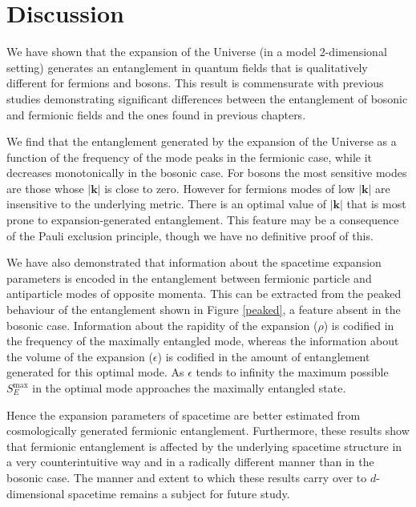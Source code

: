 \section{Discussion}\label{conclusionsexp}

We have shown that the expansion of the Universe (in a model 2-dimensional setting) generates an entanglement in quantum fields that is qualitatively different for fermions and bosons.  This result is commensurate with previous studies demonstrating significant differences between the entanglement of bosonic and fermionic fields  \cite{Alicefalls,AlsingSchul,Adeschul} and the ones found in previous chapters.  


 We find that the entanglement generated by the expansion of the Universe as a function of the frequency of the mode peaks in the fermionic case, while  it decreases monotonically in the bosonic case. 
For bosons the most sensitive modes are those  whose $|\bm k|$ is close to zero. However for fermions modes of low $|\bm k|$ are insensitive to the underlying metric. There is an optimal value of $|\bm k|$ that is most prone to expansion-generated entanglement.  This feature may be a consequence of the Pauli exclusion principle, though we have no definitive proof of this.
 
 We have also demonstrated that information about the spacetime expansion parameters  is encoded
  in the entanglement between fermionic particle and antiparticle modes of opposite momenta.  This can be extracted from
the peaked behaviour of the entanglement shown in Figure \ref{peaked}, a feature  absent in the bosonic case.  
Information about the rapidity of the expansion ($\rho$) is codified in the frequency of the maximally entangled mode, whereas the information about the volume of the expansion ($\epsilon$) is codified in the amount of entanglement generated for this optimal mode. As  $\epsilon$ tends to infinity the maximum possible $S_E^{\text{max}}$ in the optimal mode approaches the maximally entangled state. 


Hence the expansion parameters of spacetime are better estimated from cosmologically generated fermionic entanglement.   Furthermore, these results   show that fermionic entanglement is affected by the underlying spacetime structure in a very counterintuitive way and in a radically different manner than in the bosonic case.  The manner and extent to which these results carry over to $d$-dimensional spacetime remains a subject for future study.


